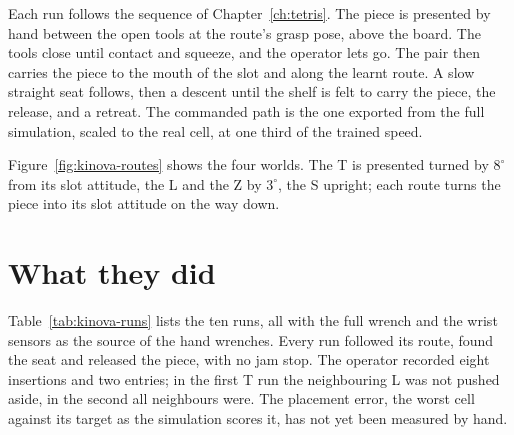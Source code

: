 Each run follows the sequence of Chapter~\ref{ch:tetris}. The piece is presented by hand between the open tools at the route's grasp pose, above the board. The tools close until contact and squeeze, and the operator lets go. The pair then carries the piece to the mouth of the slot and along the learnt route. A slow straight seat follows, then a descent until the shelf is felt to carry the piece, the release, and a retreat. The commanded path is the one exported from the full simulation, scaled to the real cell, at one third of the trained speed.


Figure~\ref{fig:kinova-routes} shows the four worlds. The T is presented turned by $8^\circ$ from its slot attitude, the L and the Z by $3^\circ$, the S upright; each route turns the piece into its slot attitude on the way down.

\section{What they did}

Table~\ref{tab:kinova-runs} lists the ten runs, all with the full wrench and the wrist sensors as the source of the hand wrenches. Every run followed its route, found the seat and released the piece, with no jam stop. The operator recorded eight insertions and two entries; in the first T run the neighbouring L was not pushed aside, in the second all neighbours were. The placement error, the worst cell against its target as the simulation scores it, has not yet been measured by hand.

\begin{table}[htbp]\centering\footnotesize
\caption{The runs of 21--22 October 2026. Asked and measured: the median normal force per hand while carrying (target of the convex program and wrist sensor). Side: the largest horizontal force the environment exerted on the piece. Twist: the largest rotation the twist channel added to a flange. Solve: median time of one convex program on the robot computer.}\label{tab:kinova-runs}
\setlength{\tabcolsep}{4pt}
\resizebox{\textwidth}{!}{}
\end{table}

